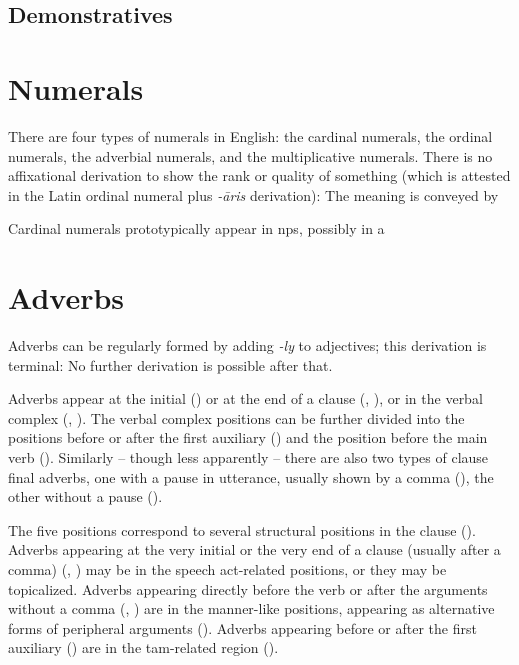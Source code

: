 \documentclass[UTF8, a4paper, oneside, scheme=plain, 12pt]{ctexbook}
\newcommand{\form}[1]{\emph{#1}}
\begin{document}
\subsection{Demonstratives}

\section{Numerals}

There are four types of numerals in English:
the cardinal numerals, 
the ordinal numerals,
the adverbial numerals,
and the multiplicative numerals.
There is no affixational derivation to show the rank or quality of something 
(which is attested in the Latin ordinal numeral plus \form{-āris} derivation):
The meaning is conveyed by 

Cardinal numerals prototypically appear in \acs{np}s,
possibly in a 

\section{Adverbs}\label{sec:pos.adverb}

Adverbs can be regularly formed by adding \form{-ly} to adjectives;
this derivation is terminal:
No further derivation is possible after that.

Adverbs appear at the initial () or
at the end of a clause (, ), 
or in the verbal complex (, ).
The verbal complex positions can be further divided into 
the positions before or after the first auxiliary ()
and the position before the main verb ().
Similarly -- though less apparently -- 
there are also two types of clause final adverbs,
one with a pause in utterance, usually shown by a comma (),
the other without a pause ().

The five positions correspond to several structural positions in the clause  
().
Adverbs appearing at the very initial or the very end of a clause (usually after a comma)
(, ) 
may be in the speech act-related positions,
or they may be topicalized.
Adverbs appearing directly before the verb 
or after the arguments without a comma 
(, ) 
are in the manner-like positions,
appearing as alternative forms of peripheral arguments
().
Adverbs appearing before or after the first auxiliary () 
are in the \acs{tam}-related region ().
\end{document}
